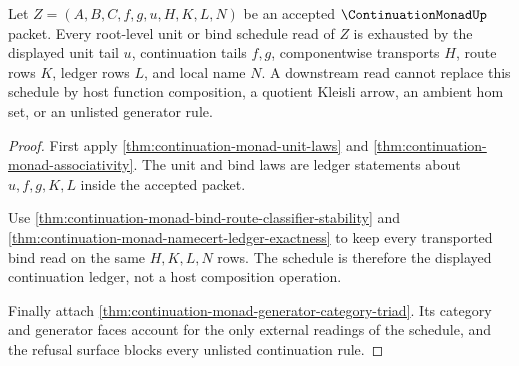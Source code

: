 \begin{theorem}
\label{thm:continuation-monad-root-bind-schedule-exhaustion}
Let $Z=(A,B,C,f,g,u,H,K,L,N)$ be an accepted $\ContinuationMonadUp$ packet. Every root-level unit or bind schedule read of $Z$ is exhausted by the displayed unit tail $u$, continuation tails $f,g$, componentwise transports $H$, route rows $K$, ledger rows $L$, and local name $N$. A downstream read cannot replace this schedule by host function composition, a quotient Kleisli arrow, an ambient hom set, or an unlisted generator rule.
\end{theorem}
\begin{proof}
First apply \autoref{thm:continuation-monad-unit-laws} and \autoref{thm:continuation-monad-associativity}. The unit and bind laws are ledger statements about $u,f,g,K,L$ inside the accepted packet.

Use \autoref{thm:continuation-monad-bind-route-classifier-stability} and \autoref{thm:continuation-monad-namecert-ledger-exactness} to keep every transported bind read on the same $H,K,L,N$ rows. The schedule is therefore the displayed continuation ledger, not a host composition operation.

Finally attach \autoref{thm:continuation-monad-generator-category-triad}. Its category and generator faces account for the only external readings of the schedule, and the refusal surface blocks every unlisted continuation rule.
\end{proof}

